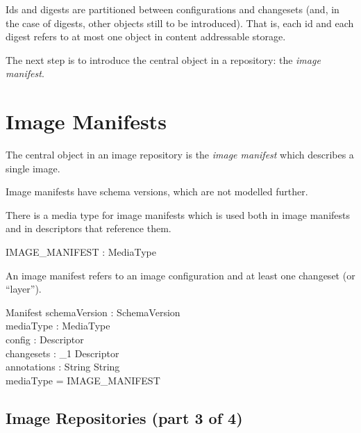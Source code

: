 \documentclass[a4paper,twoside,12pt]{article}
\begin{document}
Ids and digests are partitioned between configurations and changesets (and, in the case of digests, other objects still to be introduced).
That is, each id and each digest refers to at most one object in content addressable storage.

The next step is to introduce the central object in a repository: the \textit{image manifest}.

\newpage
\section{Image Manifests}

The central object in an image repository is the \textit{image manifest} which describes a single image.

Image manifests have schema versions, which are not modelled further.
\begin{zed}
[ SchemaVersion ] 
\end{zed}

There is a media type for image manifests which is used both in image manifests and in descriptors that reference them.
\begin{axdef}
  IMAGE\_MANIFEST : MediaType \\
\end{axdef}

An image manifest refers to an image configuration and at least one changeset (or ``layer'').
\begin{schema}{Manifest}
  schemaVersion : SchemaVersion \\
  mediaType : MediaType \\
  config : Descriptor \\
  changesets : \seq_1 Descriptor \\
  annotations : String \pfun String \\
\where
  mediaType = IMAGE\_MANIFEST \\
\end{schema}

\subsection{Image Repositories (part 3 of 4)}
\end{document}
